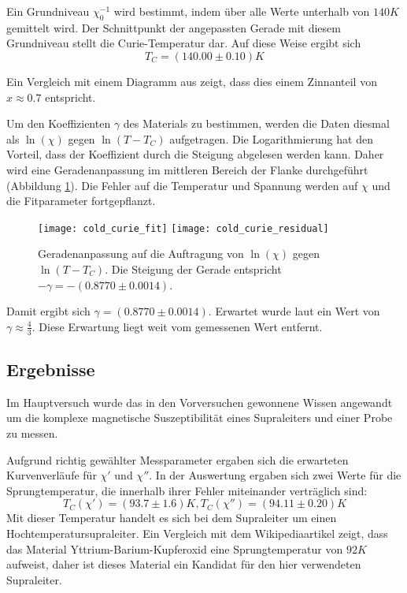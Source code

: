 \documentclass{../Misc/MontavonLaTeX/Montavon}
\begin{document}
Ein Grundniveau $\chi^{-1}_0$ wird bestimmt, indem über alle Werte unterhalb von $140 \unit{K}$ gemittelt wird. Der Schnittpunkt der angepassten Gerade mit diesem Grundniveau stellt die Curie-Temperatur dar. Auf diese Weise ergibt sich 
\[
	T_C = (140.00 \pm 0.10) \unit{K}
\]

Ein Vergleich mit einem Diagramm aus \cite[S.32]{anleitung} zeigt, dass dies einem Zinnanteil von $x \approx 0.7$ entspricht.

Um den Koeffizienten $\gamma$ des Materials zu bestimmen, werden die Daten diesmal als $\ln(\chi)$ gegen $\ln(T-T_C)$ aufgetragen. Die Logarithmierung hat den Vorteil, dass der Koeffizient durch die Steigung abgelesen werden kann. Daher wird eine Geradenanpassung im mittleren Bereich der Flanke durchgeführt (Abbildung \ref{fig:cold_curie_fit}). Die Fehler auf die Temperatur und Spannung werden auf $\chi$ und die Fitparameter fortgepflanzt. 

\begin{figure}[htbp]
\centering
\texttt{[image: cold\_curie\_fit]}
\texttt{[image: cold\_curie\_residual]}
\caption{Geradenanpassung auf die Auftragung von $\ln(\chi)$ gegen $\ln(T-T_C)$. Die Steigung der Gerade entspricht $-\gamma = -(0.8770 \pm 0.0014)$.}
\label{fig:cold_curie_fit}
\end{figure}

Damit ergibt sich $\gamma = (0.8770 \pm 0.0014)$. Erwartet wurde laut \cite{anleitung} ein Wert von $\gamma \approx \frac{4}{3}$. Diese Erwartung liegt weit vom gemessenen Wert entfernt.

\subsection{Ergebnisse}

Im Hauptversuch wurde das in den Vorversuchen gewonnene Wissen angewandt um die komplexe magnetische Suszeptibilität eines Supraleiters und einer Probe zu messen. 

Aufgrund richtig gewählter Messparameter ergaben sich die erwarteten Kurvenverläufe für $\chi'$ und $\chi''$. In der Auswertung ergaben sich zwei Werte für die Sprungtemperatur, die innerhalb ihrer Fehler miteinander verträglich sind:
\[
	T_C(\chi') = (93.7 \pm 1.6) \unit{K}, T_C(\chi'') = (94.11 \pm 0.20) \unit{K}
\]
Mit dieser Temperatur handelt es sich bei dem Supraleiter um einen Hochtemperatursupraleiter. Ein Vergleich mit dem Wikipediaartikel \cite{wiki_hochtemperatursupraleiter} zeigt, dass das Material Yttrium-Barium-Kupferoxid eine Sprungtemperatur von $92 \unit{K}$ aufweist, daher ist dieses Material ein Kandidat für den hier verwendeten Supraleiter. 
\end{document}

